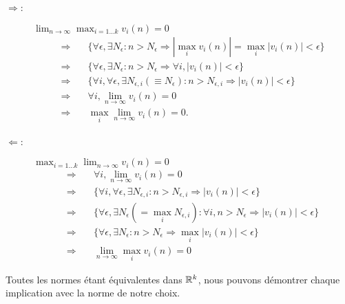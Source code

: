\begin{description}
  \item[$\Rightarrow$:] $\lim_{n \rightarrow \infty} \max_{i=1 \dots k} v_i(n) = 0$
  \begin{align*}
    \Rightarrow \quad & \{\forall \epsilon, \exists N_\epsilon: n > N_\epsilon \Rightarrow |\max_i v_i(n)| = \max_i |v_i(n)| < \epsilon\} \\
    \Rightarrow \quad & \{\forall \epsilon, \exists N_\epsilon: n > N_\epsilon \Rightarrow \forall i, |v_i(n)| < \epsilon\} \\
    \Rightarrow \quad & \{\forall i, \forall \epsilon, \exists N_{\epsilon, i}(\equiv N_\epsilon): n > N_{\epsilon, i} \Rightarrow |v_i(n)| < \epsilon\} \\
    \Rightarrow \quad & \forall i, \lim_{n \rightarrow \infty} v_i(n) = 0 \\
    \Rightarrow \quad & \max_i \lim_{n \rightarrow \infty} v_i(n) = 0.
  \end{align*}
  \item[$\Leftarrow$:] $\max_{i=1 \dots k} \lim_{n \rightarrow \infty} v_i(n) = 0$
  \begin{align*}
    \Rightarrow \quad & \forall i, \lim_{n \rightarrow \infty} v_i(n) = 0 \\
    \Rightarrow \quad & \{\forall i, \forall \epsilon, \exists N_{\epsilon, i}: n > N_{\epsilon, i} \Rightarrow |v_i(n)| < \epsilon\}\\
    \Rightarrow \quad & \{\forall \epsilon, \exists N_\epsilon (= \max_i N_{\epsilon, i}): \forall i, n > N_\epsilon \Rightarrow |v_i(n)| < \epsilon\}\\
    \Rightarrow \quad & \{\forall \epsilon, \exists N_\epsilon: n > N_\epsilon \Rightarrow \max_i |v_i(n)| < \epsilon\}\\
    \Rightarrow \quad & \lim_{n \rightarrow \infty} \max_i v_i(n) = 0
  \end{align*}
\end{description}
\eproof

Toutes les normes étant équivalentes dans $\mathbb{R}^k$, nous pouvons démontrer chaque implication avec la norme de notre choix.

